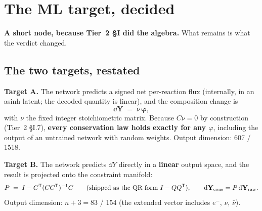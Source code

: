 %
%

\section{The ML target, decided}
\label{part:target}

\textbf{A short node, because Tier~2 \S I did the algebra.} What remains is
what the verdict changed.

\subsection{The two targets, restated}
\label{sec:twotargets}

\textbf{Target A.} The network predicts a signed net per-reaction flux
(internally, in an asinh latent; the decoded quantity is linear), and the
composition change is
%
\begin{equation}
\label{eq:targeta}
\dd\mathbf Y \;=\; \nu\,\boldsymbol\varphi ,
\end{equation}
%
with $\nu$ the fixed integer stoichiometric matrix. Because $C\nu = 0$ by
construction (Tier~2 \S I.7), \textbf{every conservation law holds exactly for
any $\varphi$}, including the output of an untrained network with random
weights. Output dimension: 607 / 1518.

\textbf{Target B.} The network predicts $\dd Y$ directly in a \textbf{linear}
output space, and the result is projected onto the constraint manifold:
%
\begin{equation}
\label{eq:targetb}
P \;=\; I - C^{\mathsf{T}}(CC^{\mathsf{T}})^{-1}C
\qquad\text{(shipped as the QR form } I - QQ^{\mathsf{T}}\text{)},
\qquad \mathrm{d}\mathbf Y_{\mathrm{cons}} = P\,\mathrm{d}\mathbf Y_{\mathrm{raw}} .
\end{equation}
%
Output dimension: $n + 3 = 83$ / 154 (the extended vector includes $e^-$,
$\nu$, $\bar\nu$).

